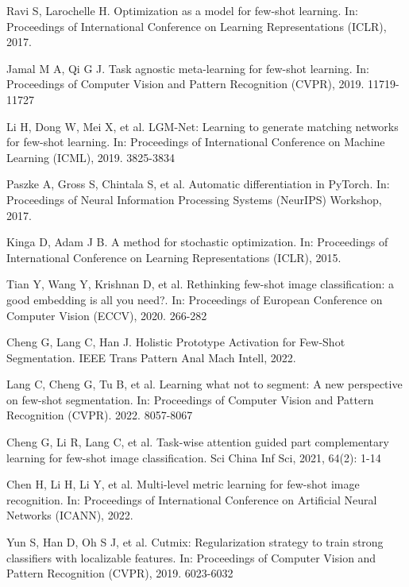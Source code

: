 \documentclass{SCIS2019}
\begin{document}
\begin{thebibliography}{99}
	 Ravi S, Larochelle H. Optimization as a model for few-shot learning. In: Proceedings of International Conference on Learning Representations (ICLR), 2017.
	
	 Jamal M A, Qi G J. Task agnostic meta-learning for few-shot learning. In: Proceedings of Computer Vision and Pattern Recognition (CVPR), 2019. 11719-11727
	
	 Li H, Dong W, Mei X, et al. LGM-Net: Learning to generate matching networks for few-shot learning. In: Proceedings of International Conference on Machine Learning (ICML), 2019. 3825-3834
	
	 Paszke A, Gross S, Chintala S, et al. Automatic differentiation in PyTorch. In: Proceedings of Neural Information Processing Systems (NeurIPS) Workshop, 2017.
	
	 Kinga D, Adam J B. A method for stochastic optimization. In: Proceedings of International Conference on Learning Representations (ICLR), 2015.
	
	 Tian Y, Wang Y, Krishnan D, et al. Rethinking few-shot image classification: a good embedding is all you need?. In: Proceedings of European Conference on Computer Vision (ECCV), 2020. 266-282
	
	 Cheng G, Lang C, Han J. Holistic Prototype Activation for Few-Shot Segmentation. IEEE Trans Pattern Anal Mach Intell, 2022.
	
	 Lang C, Cheng G, Tu B, et al. Learning what not to segment: A new perspective on few-shot segmentation. In: Proceedings of  Computer Vision and Pattern Recognition (CVPR). 2022. 8057-8067
	
	 Cheng G, Li R, Lang C, et al. Task-wise attention guided part complementary learning for few-shot image classification. Sci China Inf Sci, 2021, 64(2): 1-14
	
	 Chen H, Li H, Li Y, et al. Multi-level metric learning for few-shot image recognition. In: Proceedings of International Conference on Artificial Neural Networks (ICANN), 2022.
	
	 Yun S, Han D, Oh S J, et al. Cutmix: Regularization strategy to train strong classifiers with localizable features.  In: Proceedings of Computer Vision and Pattern Recognition (CVPR), 2019. 6023-6032
	
\end{thebibliography}
\end{document}
